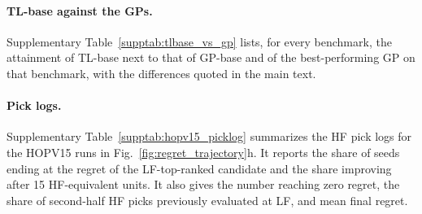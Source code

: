 \paragraph{TL-base against the GPs.} Supplementary Table~\ref{supptab:tlbase_vs_gp} lists, for every benchmark, the attainment of TL-base next to that of GP-base and of the best-performing GP on that benchmark, with the differences quoted in the main text.

\paragraph{Pick logs.} Supplementary Table~\ref{supptab:hopv15_picklog} summarizes the HF pick logs for the HOPV15 runs in Fig.~\ref{fig:regret_trajectory}h. It reports the share of seeds ending at the regret of the LF-top-ranked candidate and the share improving after 15 HF-equivalent units. It also gives the number reaching zero regret, the share of second-half HF picks previously evaluated at LF, and mean final regret.

